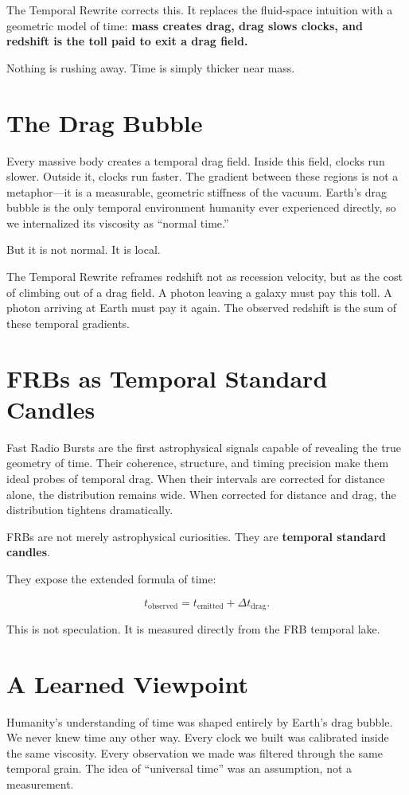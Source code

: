 \documentclass[11pt, letterpaper, openany]{book}
\begin{document}
The Temporal Rewrite corrects this.  
It replaces the fluid-space intuition with a geometric model of time:  
\textbf{mass creates drag, drag slows clocks, and redshift is the toll paid to exit a drag field.}

Nothing is rushing away.  
Time is simply thicker near mass.

\section*{The Drag Bubble}
Every massive body creates a temporal drag field. Inside this field, clocks run slower. Outside it,
clocks run faster. The gradient between these regions is not a metaphor—it is a measurable,
geometric stiffness of the vacuum. Earth’s drag bubble is the only temporal environment humanity
ever experienced directly, so we internalized its viscosity as “normal time.”

But it is not normal.  
It is local.

The Temporal Rewrite reframes redshift not as recession velocity, but as the cost of climbing out of
a drag field. A photon leaving a galaxy must pay this toll. A photon arriving at Earth must pay it
again. The observed redshift is the sum of these temporal gradients.

\section*{FRBs as Temporal Standard Candles}
Fast Radio Bursts are the first astrophysical signals capable of revealing the true geometry of time.
Their coherence, structure, and timing precision make them ideal probes of temporal drag. When
their intervals are corrected for distance alone, the distribution remains wide. When corrected for
distance and drag, the distribution tightens dramatically.

FRBs are not merely astrophysical curiosities.  
They are \textbf{temporal standard candles}.

They expose the extended formula of time:



\[
t_{\mathrm{observed}} = t_{\mathrm{emitted}} + \Delta t_{\mathrm{drag}}.
\]



This is not speculation.  
It is measured directly from the FRB temporal lake.

\section*{A Learned Viewpoint}
Humanity’s understanding of time was shaped entirely by Earth’s drag bubble. We never knew time
any other way. Every clock we built was calibrated inside the same viscosity. Every observation we
made was filtered through the same temporal grain. The idea of “universal time” was an assumption,
not a measurement.
\end{document}

